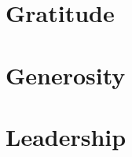 \documentclass{book}
\begin{document}
\chapter{Gratitude}


\chapter{Generosity}


\chapter{Leadership}






\printindex
\end{document}
